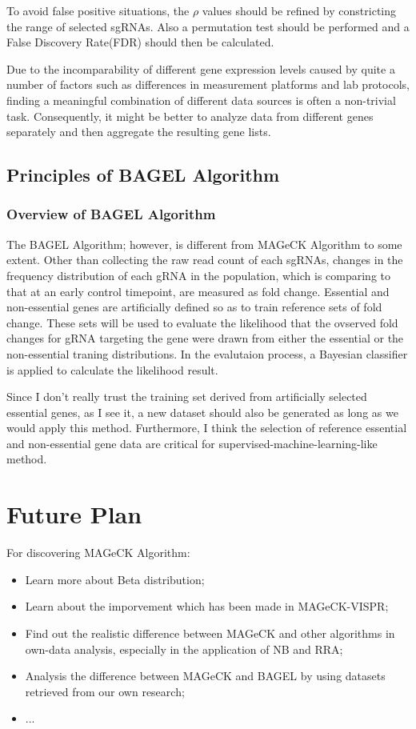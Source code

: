 \documentclass[fleqn,10pt]{wlscirep}
\begin{document}
To avoid false positive situations, the $\rho$ values should be refined by constricting the range of selected sgRNAs\cite{li2014mageck}.  Also a permutation test should be performed and a False Discovery Rate(FDR) should then be calculated.

Due to the incomparability of different gene expression levels caused by quite a number of factors such as differences in measurement platforms and lab protocols, finding a meaningful combination of different data sources is often a non-trivial task.\cite{doi:10.1093/bioinformatics/btr709}  Consequently, it might be better to analyze data from different genes separately and then aggregate the resulting gene lists. 

\subsection*{Principles of BAGEL Algorithm}

\subsubsection*{Overview of BAGEL Algorithm}\cite{hart2016bagel}
The BAGEL Algorithm; however, is different from MAGeCK Algorithm to some extent.  Other than collecting the raw read count of each sgRNAs, changes in the frequency distribution of each gRNA in the population, which is comparing to that at an early control timepoint, are measured as fold change. Essential and non-essential genes are artificially defined so as to train  reference sets of fold change.  These sets will be used to evaluate the likelihood that the ovserved fold changes for gRNA targeting the gene were drawn from either the essential or the non-essential traning distributions.  In the evalutaion process, a Bayesian classifier is applied to calculate the likelihood result.

Since I don't really trust the training set derived from artificially selected essential genes, as I see it, a new dataset should also be generated as long as we would apply this method. Furthermore, I think the selection of reference essential and non-essential gene data are critical for supervised-machine-learning-like method.

\section*{Future Plan}

For discovering MAGeCK Algorithm:
\begin{itemize}
    \item Learn more about Beta distribution;
    \item Learn about the imporvement which has been made in MAGeCK-VISPR;
    \item Find out the realistic difference between MAGeCK and other algorithms in own-data analysis, especially in the application of NB and RRA;
    \item Analysis the difference between MAGeCK and BAGEL by using datasets retrieved from our own research;
    \item ...
\end{itemize}
\end{document}
